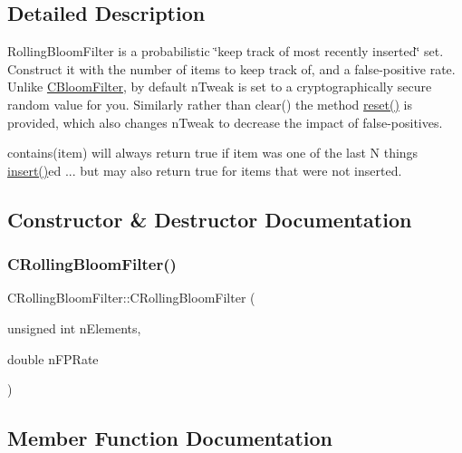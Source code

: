 \subsection{Detailed Description}
Rolling\+Bloom\+Filter is a probabilistic \char`\"{}keep track of most recently inserted\char`\"{} set. Construct it with the number of items to keep track of, and a false-\/positive rate. Unlike \mbox{\hyperlink{class_c_bloom_filter}{C\+Bloom\+Filter}}, by default n\+Tweak is set to a cryptographically secure random value for you. Similarly rather than clear() the method \mbox{\hyperlink{class_c_rolling_bloom_filter_a7615966dc0beaa381892d8f43aeb53a3}{reset()}} is provided, which also changes n\+Tweak to decrease the impact of false-\/positives.

contains(item) will always return true if item was one of the last N things \mbox{\hyperlink{class_c_rolling_bloom_filter_a0fedbf0cf38c9070a30c7c5f8299f5d7}{insert()}}\textquotesingle{}ed ... but may also return true for items that were not inserted. 

\subsection{Constructor \& Destructor Documentation}
\mbox{\label{class_c_rolling_bloom_filter_a70f2c27fa28fc89676d3873159cfdecb}} 
\subsubsection{\texorpdfstring{C\+Rolling\+Bloom\+Filter()}{CRollingBloomFilter()}}
{\footnotesize\ttfamily C\+Rolling\+Bloom\+Filter\+::\+C\+Rolling\+Bloom\+Filter (\begin{DoxyParamCaption}\item[{unsigned int}]{n\+Elements,  }\item[{double}]{n\+F\+P\+Rate }\end{DoxyParamCaption})}



\subsection{Member Function Documentation}
\mbox{\label{class_c_rolling_bloom_filter_a4f7d6161274b03c63be50aadb1fe46b7}} 
